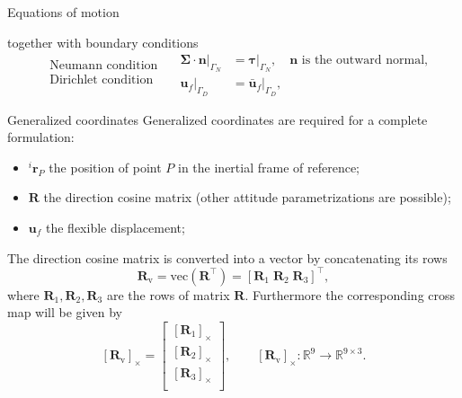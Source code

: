 \documentclass[aspectratio=169]{ISAE-Beamer}
\newcommand{\crmat}[1]{\ensuremath{[#1]_{\times}}}
\begin{document}
\begin{frame}{Equations of motion}
\begin{overlayarea}{\textwidth}{0.8\textheight}
{		together with boundary conditions
		\begin{equation*}
		\begin{aligned}
		&\text{Neumann condition} \\
		&\text{Dirichlet condition} \\
		\end{aligned} \quad
		\begin{aligned}
		\bm\Sigma \cdot \bm{n}|_{\Gamma_N} &= \bm\tau|_{\Gamma_N}, \quad \text{$\bm{n}$ is the outward normal,} \\
		\bm{u}_f|_{\Gamma_D} &= \bm{\bar{u}}_f|_{\Gamma_D},
		\end{aligned}
		\end{equation*}
	}
\end{overlayarea}
\end{frame}


\begin{frame}{Generalized coordinates}
Generalized coordinates are required for a complete formulation:
\begin{itemize}
\item $^i \bm{r}_P$ the position of point $P$ in the inertial frame of reference;
\item $\bm{R}$ the direction cosine matrix (other attitude parametrizations are possible);
\item $\bm{u}_f$ the flexible displacement;
\end{itemize}
The direction cosine matrix is converted into a vector by concatenating its rows
\begin{equation*}
\bm{R}_{\text{v}} = \text{vec}(\bm{R}^\top) = [\bm{R}_1 \; \bm{R}_2 \; \bm{R}_3]^\top,
\end{equation*}
where $\bm{R}_{1}, \bm{R}_{2}, \bm{R}_{3}$ are the rows of matrix $\bm{R}$. Furthermore the corresponding cross map will be given by
\begin{equation*}
\crmat{\bm{R}_{\text{v}}} = 
\begin{bmatrix}
\crmat{\bm{R}_1} \\
\crmat{\bm{R}_2} \\
\crmat{\bm{R}_3} \\
\end{bmatrix}, \qquad 
\crmat{\bm{R}_{\text{v}}} : \mathbb{R}^9 \rightarrow \mathbb{R}^{9 \times 3}.
\end{equation*}
\end{frame}
\end{document}
